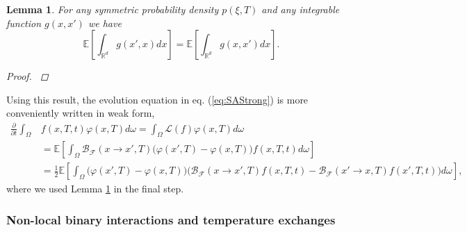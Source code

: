 \documentclass[10pt,a4paper]{article}
\theoremstyle{theorem}
\newtheorem{lemma}{Lemma}[section]
\numberwithin{equation}{section}
\begin{document}
\begin{lemma}
\label{lemma:symm}
For any symmetric probability density $p(\xi,T)$ and any integrable function $g(x,x')$ we have
\begin{equation}
\mathbb{E}\left[\int_{\mathbb{R}^d}g(x',x)dx\right]=\mathbb{E}\left[\int_{\mathbb{R}^d}g(x,x')dx\right].
\end{equation}
\begin{proof}
\cite[Lemma 3.1]{pareschi_optimization_2024}
\end{proof}
\end{lemma}
Using this result, the evolution equation in eq. (\ref{eq:SAStrong}) is more conveniently written in weak form,
\begin{align}
\nonumber
\frac{\partial}{\partial t}\int_{\Omega}& f(x,T,t)\varphi(x,T)d\omega =\int_{\Omega} \mathcal{L}(f)\varphi(x,T)d\omega\\
\label{eq:SAweak}
&=\mathbb{E}\left[\int_{\Omega}\mathcal{B}_\mathcal{F}(x\rightarrow x',T)\big(\varphi(x',T)-\varphi(x,T)\big)f(x,T,t)d\omega \right]
\\
\nonumber
&=\frac{1}{2}\mathbb{E}\left[\int_{\Omega}\big(\varphi(x',T)-\varphi(x,T)\big)\big(\mathcal{B}_\mathcal{F}(x\rightarrow x',T)f(x,T,t) -\mathcal{B}_\mathcal{F}(x'\rightarrow x,T)f(x',T,t) \big)d\omega \right],
\end{align}
where we used Lemma \ref{lemma:symm} in the final step.

\subsubsection{Non-local binary interactions and temperature exchanges}
\label{subsec:population_Qff}
\end{document}
